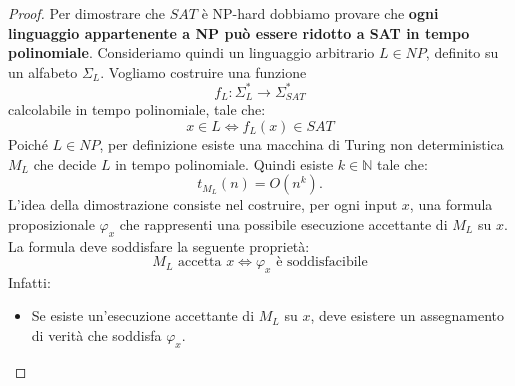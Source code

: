 \begin{proof}
\vspace{0.1cm}    
Per dimostrare che $SAT$ è NP-hard dobbiamo provare che
\textbf{ogni linguaggio appartenente a NP può essere
ridotto a SAT in tempo polinomiale}.
Consideriamo quindi un linguaggio arbitrario
$L\in NP$, definito su un alfabeto $\Sigma_L$.
Vogliamo costruire una funzione
\[
f_L:\Sigma_L^*\rightarrow\Sigma_{SAT}^*
\]
calcolabile in tempo polinomiale, tale che:
\[
\boxed{
x\in L\iff f_L(x)\in SAT
}
\]
Poiché $L\in NP$, per definizione esiste una macchina
di Turing non deterministica $M_L$ che decide $L$
in tempo polinomiale.
Quindi esiste $k\in\mathbb N$ tale che:
\[
t_{M_L}(n)=O(n^k).
\]
L'idea della dimostrazione consiste nel costruire,
per ogni input $x$, una formula proposizionale
$\varphi_x$ che rappresenti una possibile
esecuzione accettante di $M_L$ su $x$.\\
La formula deve soddisfare la seguente proprietà:
\[
\boxed{
M_L\text{ accetta }x
\iff
\varphi_x\text{ è soddisfacibile}
}
\]
Infatti:
\begin{itemize}
    \item Se esiste un'esecuzione accettante di $M_L$
    su $x$, deve esistere un assegnamento di verità
    che soddisfa $\varphi_x$.


\end{itemize}
\end{proof}
